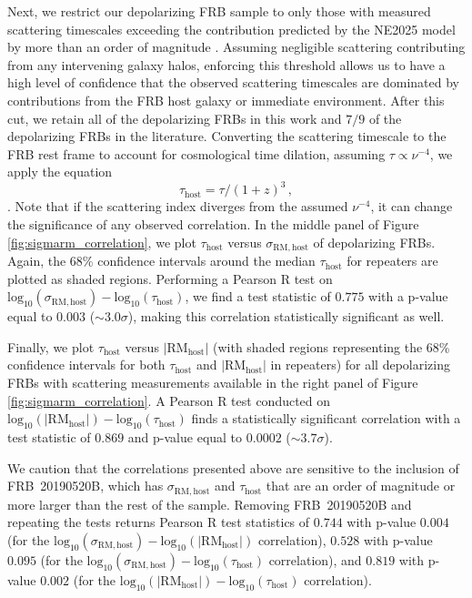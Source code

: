 \documentclass[twocolumn, linenumbers]{aastex701}
\begin{document}
Next, we restrict our depolarizing FRB sample to only those with measured scattering timescales exceeding the contribution predicted by the NE2025 model \citep[scaled to the same reference frequency assuming a frequency dependence of $\nu^{-4}$;][]{2026arXiv260211838O} by more than an order of magnitude \citep{2019MNRAS.486.3636P, 2022ApJ...927...59L, 2023MNRAS.519..821O, 2025ApJ...992..206C, 2025PASA...42..133S}. Assuming negligible scattering contributing from any intervening galaxy halos, enforcing this threshold allows us to have a high level of confidence that the observed scattering timescales are dominated by contributions from the FRB host galaxy or immediate environment. After this cut, we retain all of the depolarizing FRBs in this work and $7/9$ of the depolarizing FRBs in the literature. Converting the scattering timescale to the FRB rest frame to account for cosmological time dilation, assuming $\tau \propto \nu^{-4}$, we apply the equation
\begin{equation}
\tau_\mathrm{host} = \tau/(1+z)^3\,, \label{eq:tau_host}
\end{equation}
\citep{Macquart_2013_ApJ}. Note that if the scattering index diverges from the assumed $\nu^{-4}$, it can change the significance of any observed correlation. In the middle panel of Figure \ref{fig:sigmarm_correlation}, we plot $\tau_\mathrm{host}$ versus $\sigma_\mathrm{RM,host}$ of depolarizing FRBs. Again, the 68\% confidence intervals around the median $\tau_\mathrm{host}$ for repeaters are plotted as shaded regions. Performing a Pearson R test on $\mathrm{log}_{10}(\sigma_\mathrm{RM,host})-\mathrm{log}_{10}(\tau_\mathrm{host})$, we find a test statistic of $0.775$ with a p-value equal to $0.003$ ($\sim 3.0 \sigma$), making this correlation statistically significant as well.

Finally, we plot $\tau_\mathrm{host}$ versus $|\mathrm{RM}_\mathrm{host}|$ (with shaded regions representing the 68\% confidence intervals for both $\tau_\mathrm{host}$ and $|\mathrm{RM}_\mathrm{host}|$ in repeaters) for all depolarizing FRBs with scattering measurements available in the right panel of Figure \ref{fig:sigmarm_correlation}. A Pearson R test conducted on $\mathrm{log}_{10}(|\mathrm{RM}_\mathrm{host}|)-\mathrm{log}_{10}(\tau_\mathrm{host})$ finds a statistically significant correlation with a test statistic of $0.869$ and p-value equal to $0.0002$ ($\sim 3.7 \sigma$).

We caution that the correlations presented above are sensitive to the inclusion of FRB~20190520B, which has $\sigma_\mathrm{RM,host}$ and $\tau_\mathrm{host}$ that are an order of magnitude or more larger than the rest of the sample. Removing FRB~20190520B and repeating the tests returns Pearson R test statistics of $0.744$ with p-value $0.004$ (for the $\mathrm{log}_{10}(\sigma_\mathrm{RM,host})-\mathrm{log}_{10}(|\mathrm{RM}_\mathrm{host}|)$ correlation), $0.528$ with p-value $0.095$ (for the $\mathrm{log}_{10}(\sigma_\mathrm{RM,host})-\mathrm{log}_{10}(\tau_\mathrm{host})$ correlation), and $0.819$ with p-value $0.002$ (for the $\mathrm{log}_{10}(|\mathrm{RM}_\mathrm{host}|)-\mathrm{log}_{10}(\tau_\mathrm{host})$ correlation). 
\end{document}
